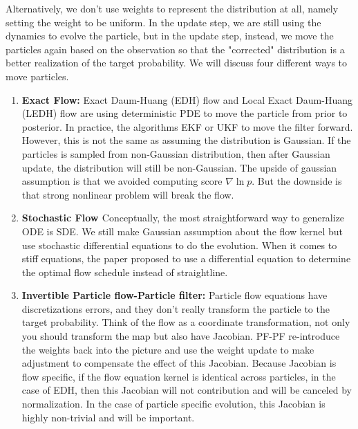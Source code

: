 \documentclass{article}
\begin{document}
Alternatively, we don't use weights to represent the distribution at all, namely setting the weight to be uniform. In the update step, we are still using the dynamics to evolve the particle, but in the update step, instead, we move the particles again based on the observation so that the "corrected" distribution is a better realization of the target probability. We will discuss four different ways to move particles. 

\begin{enumerate}
    \item \textbf{Exact Flow:} Exact Daum-Huang (EDH) flow and Local Exact Daum-Huang (LEDH) flow\cite{daum2010exact,daum2011particle,ding2012implementation} are using deterministic PDE to move the particle from prior to posterior. In practice, the algorithms EKF or UKF to move the filter forward. However, this is not the same as assuming the distribution is Gaussian. If the particles is sampled from non-Gaussian distribution, then after Gaussian update, the distribution will still be non-Gaussian. The upside of gaussian assumption is that we avoided computing score $\nabla \ln p$. But the downside is that strong nonlinear problem will break the flow. 
    
    \item \textbf{Stochastic Flow \cite{dai-new-2021}} Conceptually, the most straightforward way to generalize ODE is SDE. We still make Gaussian assumption about the flow kernel but use stochastic differential equations to do the evolution. When it comes to stiff equations, the paper \cite{dai-stiffness-mitigation-2021} proposed to use a differential equation to determine the optimal flow schedule instead of straightline. 



    
    \item \textbf{Invertible Particle flow-Particle filter:} Particle flow equations have discretizations errors, and they don't really transform the particle to the target probability. Think of the flow as a coordinate transformation, not only you should transform the map but also have Jacobian. PF-PF re-introduce the weights back into the picture and use the weight update to make adjustment to compensate the effect of this Jacobian. Because Jacobian is flow specific, if the flow equation kernel is identical across particles, in the case of EDH, then this Jacobian will not contribution and will be canceled by normalization. In the case of particle specific evolution, this Jacobian is highly non-trivial and will be important.
\end{enumerate}
\end{document}
